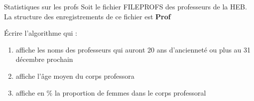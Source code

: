 \begin{Exercice}{Statistiques sur les profs}
	Soit le fichier FILEPROFS des professeurs de la
	HEB. La structure des enregistrements de ce fichier est {\textbf{Prof}}
	
	
	Écrire l’algorithme qui :
	
	\begin{enumerate}[label=\alph*)]
		\item 
			affiche les noms des professeurs qui auront 20 ans d’ancienneté ou plus
			au 31 décembre prochain
		\item 
			affiche l’âge moyen du corps professora
		\item 
			affiche en \% la proportion de femmes dans le corps professoral
	\end{enumerate}
\end{Exercice}

